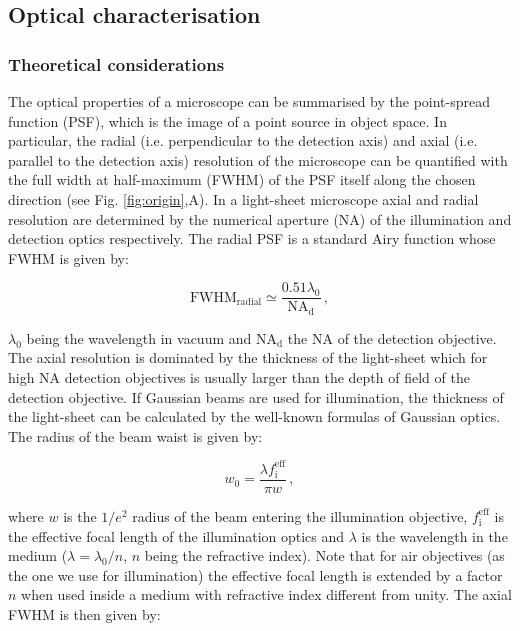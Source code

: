 \documentclass[12pt]{spieman}  %
\begin{document}
\subsection{Optical characterisation}

\subsubsection{Theoretical considerations}

The optical properties of a microscope can be summarised by the point-spread function (PSF), which is the image of a point source in object space. In particular, the radial (i.e. perpendicular to the detection axis) and axial (i.e. parallel to the detection axis) resolution of the microscope can be quantified with the full width at half-maximum (FWHM) of the PSF itself along the chosen direction (see Fig. \ref{fig:origin},A). In a light-sheet microscope axial and radial resolution are determined by the numerical aperture (NA) of the illumination and detection optics respectively. The radial PSF is a standard Airy function whose FWHM is given by:

\begin{equation}
\text{FWHM}_{\text{radial}} \simeq \frac{0.51 \lambda_0}{\text{NA}_{\text{d}}} \, ,
\end{equation}

$\lambda_0$ being the wavelength in vacuum and $\text{NA}_{\text{d}}$ the NA of the detection objective. The axial resolution is dominated by the thickness of the light-sheet which for high NA detection objectives is usually larger than the depth of field of the detection objective. If Gaussian beams are used for illumination, the thickness of the light-sheet can be calculated by the well-known formulas of Gaussian optics\cite{Teich}. The radius of the beam waist is given by:

\begin{equation}
w_0 = \frac{\lambda f_{\text{i}}^{\text{eff}}}{\pi w} \, ,
\end{equation}

where $w$ is the $1/e^2$ radius of the beam entering the illumination objective, $ f_{\text{i}}^{\text{eff}}$ is the effective focal length of the illumination optics and $\lambda$ is the wavelength in the medium ($\lambda = \lambda_0 / n$, $n$ being the refractive index). Note that for air objectives (as the one we use for illumination) the effective focal length is extended by a factor $n$ when used inside a medium with refractive index different from unity\cite{Silvestri2012}.
The axial FWHM is then given by:
\end{document}
